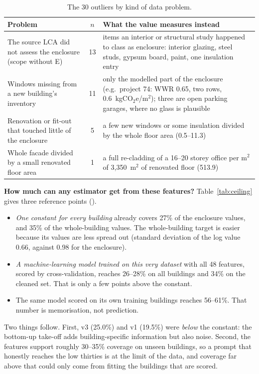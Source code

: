 \documentclass[10pt,letterpaper]{article}
\newcommand{\coe}{kgCO$_2$e/m$^2$}
\begin{document}
\begin{table}[t]
\centering\footnotesize
\caption{The 30 outliers by kind of data problem.}
\label{tab:outliers}
\setlength{\tabcolsep}{3pt}
\begin{tabular}{p{}cp{}}
\toprule
Problem & $n$ & What the value measures instead \\
\midrule
The source LCA did not assess the enclosure (scope without E) & 13 & items an interior or structural study happened to class as enclosure: interior glazing, steel studs, gypsum board, paint, one insulation entry \\
Windows missing from a new building's inventory & 11 & only the modelled part of the enclosure (e.g.\ project 74: WWR 0.65, two rows, 0.6~\coe{}); three are open parking garages, where no glass is plausible \\
Renovation or fit-out that touched little of the enclosure & 5 & a few new windows or some insulation divided by the whole floor area (0.5--11.3) \\
Whole facade divided by a small renovated floor area & 1 & a full re-cladding of a 16--20 storey office per m$^2$ of 3{,}350~m$^2$ of renovated floor (513.9) \\
\bottomrule
\end{tabular}
\end{table}

\textbf{How much can any estimator get from these features?} Table~\ref{tab:ceiling} gives three reference points ().
\begin{itemize}
\item \emph{One constant for every building} already covers 27\% of the enclosure values, and 35\% of the whole-building values. The whole-building target is easier because its values are less spread out (standard deviation of the log value 0.66, against 0.98 for the enclosure).
\item \emph{A machine-learning model trained on this very dataset} with all 48 features, scored by cross-validation, reaches 26--28\% on all buildings and 34\% on the cleaned set. That is only a few points above the constant.
\item The same model scored on its own training buildings reaches 56--61\%. That number is memorisation, not prediction.
\end{itemize}
Two things follow. First, v3 (25.0\%) and v1 (19.5\%) were \emph{below} the constant: the bottom-up take-off adds building-specific information but also noise. Second, the features support roughly 30--35\% coverage on unseen buildings, so a prompt that honestly reaches the low thirties is at the limit of the data, and coverage far above that could only come from fitting the buildings that are scored.
\end{document}
